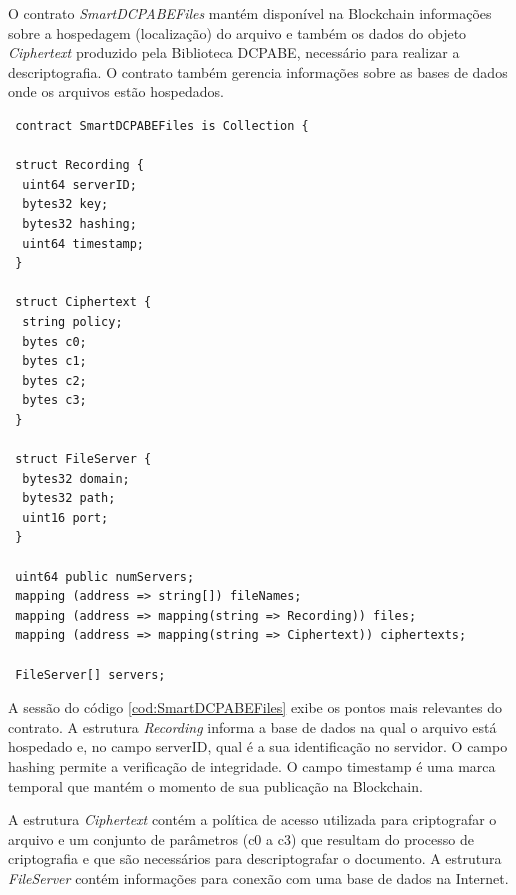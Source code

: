 \documentclass[a4paper,11pt]{article}
\begin{document}
O contrato \emph{SmartDCPABEFiles} mantém disponível na Blockchain informações sobre a hospedagem (localização) do arquivo e também os dados do objeto \emph{Ciphertext} produzido pela Biblioteca DCPABE, necessário para realizar a descriptografia.
O contrato também gerencia informações sobre as bases de dados onde os arquivos estão hospedados.


\begin{lstlisting}
 contract SmartDCPABEFiles is Collection {

 struct Recording {
  uint64 serverID;
  bytes32 key;
  bytes32 hashing;
  uint64 timestamp;
 }

 struct Ciphertext {
  string policy;
  bytes c0;
  bytes c1;
  bytes c2;
  bytes c3;
 }

 struct FileServer {
  bytes32 domain;
  bytes32 path;
  uint16 port;
 }

 uint64 public numServers;
 mapping (address => string[]) fileNames;
 mapping (address => mapping(string => Recording)) files;
 mapping (address => mapping(string => Ciphertext)) ciphertexts;

 FileServer[] servers;
\end{lstlisting}


A sessão do código \ref{cod:SmartDCPABEFiles} exibe os pontos mais relevantes do contrato.
A estrutura \emph{Recording} informa a base de dados na qual o arquivo está hospedado e, no campo serverID, qual é a sua identificação no servidor.
O campo hashing permite a verificação de integridade.
O campo timestamp é uma marca temporal que mantém o momento de sua publicação na Blockchain. %

A estrutura \emph{Ciphertext} contém a política de acesso utilizada para criptografar o arquivo e um conjunto de parâmetros (c0 a c3) que resultam do processo de criptografia e que são necessários para descriptografar o documento.
A estrutura \emph{FileServer} contém informações para conexão com uma base de dados na Internet.
\end{document}
